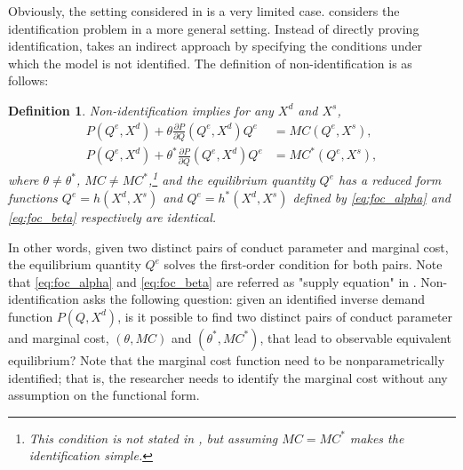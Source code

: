 \documentclass[11pt, a4paper]{article}
\newtheorem{definition}{Definition}
\theoremstyle{remark}
\begin{document}
Obviously, the setting considered in \citet{bresnahan1982oligopoly} is a very limited case.
\citet{lau1982identifying} considers the identification problem in a more general setting.
Instead of directly proving identification, \citet{lau1982identifying} takes an indirect approach by specifying the conditions under which the model is not identified. 
The definition of non-identification is as follows:
\begin{framed}
    \begin{definition}\label{def:non_identification}
    Non-identification implies for any $X^{d}$ and $X^{s}$,
    \begin{align}
    P(Q^e, X^{d}) + \theta \frac{\partial P}{\partial Q}(Q^e, X^{d})Q^e &= MC(Q^e, X^{s}),  \label{eq:foc_alpha}\\
    P(Q^e, X^{d}) + \theta^{*} \frac{\partial P}{\partial Q}(Q^e, X^{d})Q^e &= MC^{*}(Q^e, X^{s}),\label{eq:foc_beta}
    \end{align}
    where $\theta \neq \theta^{*}$, $MC \ne MC^{*}$,\footnote{This condition is not stated in \citet{lau1982identifying}, but assuming $MC = MC^{*}$ makes the identification simple.} and the equilibrium quantity $Q^e$ has a reduced form functions $Q^e = h(X^{d}, X^{s})$ and $Q^e = h^{*}(X^{d}, X^{s})$ defined by \eqref{eq:foc_alpha} and \eqref{eq:foc_beta} respectively are identical.
    \end{definition}
\end{framed}
In other words, given two distinct pairs of conduct parameter and marginal cost, the equilibrium quantity $Q^e$ solves the first-order condition for both pairs.
Note that \eqref{eq:foc_alpha} and \eqref{eq:foc_beta} are referred as "supply equation" in \citet{bresnahan1982oligopoly}.
Non-identification asks the following question: given an identified inverse demand function $P(Q, X^{d})$, is it possible to find two distinct pairs of conduct parameter and marginal cost, $(\theta, MC)$ and $(\theta^{*}, MC^{*})$, that lead to observable equivalent equilibrium?
Note that the marginal cost function need to be nonparametrically identified; that is, the researcher needs to identify the marginal cost without any assumption on the functional form.
\end{document}
